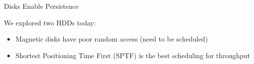   \begin{frame}{Disks Enable Persistence}

    We explored two HDDs today:
    \begin{itemize}
      \item Magnetic disks have poor random access (need to be scheduled)
      \item Shortest Positioning Time First (SPTF) is the best scheduling for throughput
    \end{itemize}
  \end{frame}


